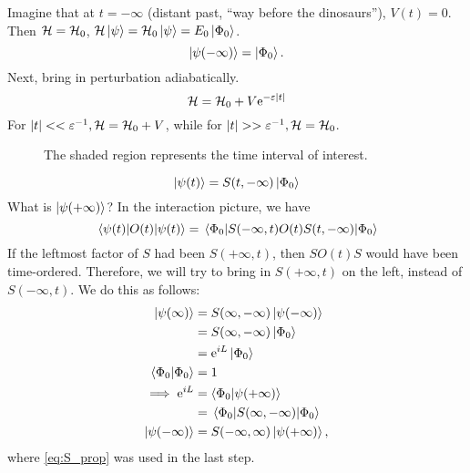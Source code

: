 Imagine that at $t = -\infty$ (distant past, ``way before the dinosaurs''), $V(t) = 0$. Then $\mathcal{H} = \mathcal{H}_0$, $\mathcal{H}\ket{\psi} = \mathcal{H}_0\ket{\psi} = E_0\ket{\Phi_0}$.
\[\ket{\psi(-\infty)} =\ket{\Phi_0}.\]
Next, bring in perturbation adiabatically. \[\mathcal{H} = \mathcal{H}_0 + V\mathrm{e}^{-\varepsilon|t|}\]
For $|t|<<\varepsilon^{-1}, \mathcal{H} = \mathcal{H}_0 +V$, while for $|t|>>\ep^{-1}, \Ha = \Ha_0$.
\begin{figure}
	\centering
	
	\caption{The shaded region represents the time interval of interest.}
	\label{fig:adiabatic}
\end{figure}

\begin{equation} 
\ket{\psi(t)} = S(t, -\infty)\ket{\Phi_0}
\end{equation}
What is $\ket{\psi(+\infty)}$? In the interaction picture, we have
\begin{equation}
\label{eq:mel}
\ev{O(t)}{\psi(t)} = \ev{S(-\infty, t)O(t)S(t, -\infty)}{\Phi_0}
\end{equation}
If the leftmost factor of $S$ had been $S(+\infty, t)$, then $SO(t)S$ would have been time-ordered. Therefore, we will try to bring in $S(+\infty, t)$ on the left, instead of $S(-\infty, t)$. We do this as follows:
\begin{align*} 
\ket{\psi(\infty)} &= S(\infty, -\infty)\ket{\psi(-\infty)} \\
&=S(\infty, -\infty)\ket{\Phi_0} \\
&= \e^{iL}\ket{\Phi_0} \\
\braket{\Phi_0}{\Phi_0} &= 1 \\
 \implies \e^{iL} &= \braket{\Phi_0}{\psi(+\infty)}\\
&=\ev{S(\infty, -\infty)}{\Phi_0}\\
\ket{\psi(-\infty)} &= S(-\infty, \infty)\ket{\psi(+\infty)},
\end{align*}
where \cref{eq:S_prop} was used in the last step. 

